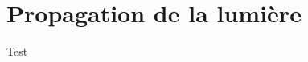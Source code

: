 \documentclass[10pt, garamond]{book}
\begin{document}
\setcounter{chapter}{0}

\chapter{Propagation de la lumi\`ere}

\begin{enumerate}[label=\sqenumi]
	 Test
\end{enumerate}
\end{document}

